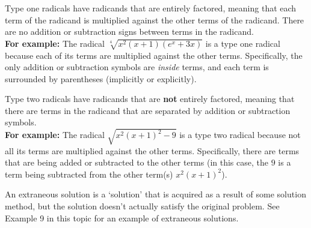 \documentclass{ximera}
\begin{document}
\begin{definition}
    Type one radicals have radicands that are entirely factored, meaning that each term of the radicand is multiplied against the other terms of the radicand. There are no addition or subtraction signs between terms in the radicand.\\
    \textbf{For example:} The radical $\sqrt[4]{x^2(x+1)(e^x + 3x)}$ is a type one radical because each of its terms are multiplied against the other terms. Specifically, the only addition or subtraction symbols are \textit{inside} terms, and each term is surrounded by parentheses (implicitly or explicitly).
\end{definition} 

\begin{definition}
    Type two radicals have radicands that are \textbf{not} entirely factored, meaning that there are terms in the radicand that are separated by addition or subtraction symbols.\\
    \textbf{For example:} The radical $\sqrt{x^2(x+1)^2 - 9}$ is a type two radical because not all its terms are multiplied against the other terms. Specifically, there are terms that are being added or subtracted to the other terms (in this case, the $9$ is a term being subtracted from the other term(s) $x^2(x+1)^2$).
\end{definition} 

\begin{definition}
    An extraneous solution is a `solution' that is acquired as a result of some solution method, but the solution doesn't actually satisfy the original problem. See Example 9 in this topic for an example of extraneous solutions.
\end{definition}
\end{document}
